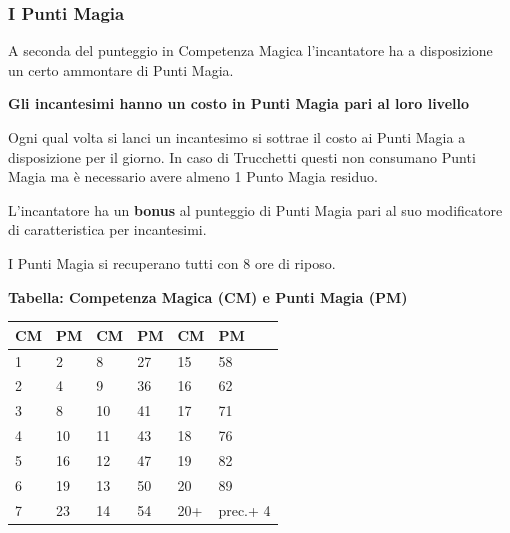 \begin{multicols}{2}
\subsubsection{I Punti Magia}\label{magiepuntimagia}\hypertarget{magiepuntimagia}{}

A seconda del punteggio in Competenza Magica l'incantatore ha a disposizione un certo ammontare di Punti Magia.

\textbf{Gli incantesimi hanno un costo in Punti Magia pari al loro livello}


Ogni qual volta si lanci un incantesimo si sottrae il costo ai Punti Magia a disposizione per il giorno.
In caso di Trucchetti questi non consumano Punti Magia ma è necessario avere almeno 1 Punto Magia residuo.

L'incantatore ha un \textbf{bonus} al punteggio di Punti Magia pari al suo modificatore di caratteristica per incantesimi.

I Punti Magia si recuperano tutti con 8 ore di riposo. 

\medskip

\textbf{Tabella: Competenza Magica (CM) e Punti Magia (PM)}

\medskip

\noindent\begin{tabularx}{0.45\textwidth}{XX|XX|XX}
\textbf{CM} & \textbf{PM}&\textbf{CM} & \textbf{PM}&\textbf{CM} & \textbf{PM}\\
\hline
1&2 &8&27&15&58\\
2&4&9&36&16&62\\
3&8&10&41&17&71\\
4&10&11&43&18&76\\
5&16&12&47&19&82\\
6&19&13&50&20&89\\
7&23&14&54&20+&prec.+ 4
\end{tabularx}





\end{multicols}
